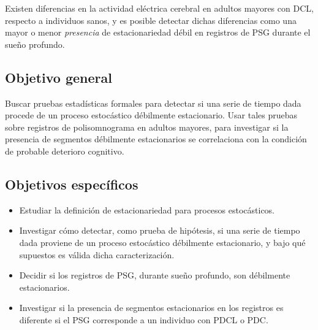 Existen diferencias en la actividad eléctrica cerebral en adultos mayores con DCL, respecto a 
individuos sanos, y es posible detectar dichas diferencias como una mayor o menor 
\textit{presencia} de estacionariedad débil en registros de PSG durante el sueño profundo.


\subsection{Objetivo general}

Buscar pruebas estadísticas formales para detectar si una serie de tiempo dada procede de un 
proceso estocástico débilmente estacionario.
%
Usar tales pruebas sobre registros de polisomnograma en adultos mayores, para investigar si la 
presencia de segmentos débilmente estacionarios se correlaciona con la condición de probable
deterioro cognitivo.


\subsection{Objetivos específicos}

\begin{itemize}
\item Estudiar la definición de estacionariedad para procesos estocásticos.

\item Investigar cómo detectar, como prueba de hipótesis, si una serie de tiempo dada proviene
de un proceso estocástico débilmente estacionario, y bajo qué supuestos 
es válida dicha caracterización.

\item Decidir si los registros de PSG, durante sueño profundo, son débilmente estacionarios.

\item Investigar si la presencia de segmentos estacionarios en los registros es diferente si el
PSG corresponde a un individuo con PDCL o PDC.
\end{itemize}

